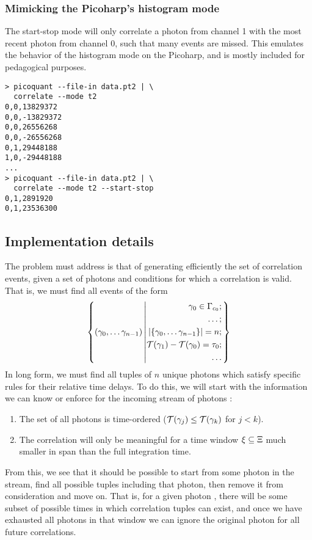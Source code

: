 \subsubsection{Mimicking the Picoharp's histogram mode}
The start-stop mode will only correlate a photon from channel 1 with the most recent photon from channel 0, such that many events are missed. This emulates the behavior of the histogram mode on the Picoharp, and is mostly included for pedagogical purposes.
\begin{verbatim}
> picoquant --file-in data.pt2 | \
  correlate --mode t2 
0,0,13829372
0,0,-13829372
0,0,26556268
0,0,-26556268
0,1,29448188
1,0,-29448188
...
> picoquant --file-in data.pt2 | \
  correlate --mode t2 --start-stop
0,1,2891920
0,1,23536300
\end{verbatim}

\subsection{Implementation details}
\label{sec:correlation_implementation}

The problem \program{correlate} must address is that of generating efficiently the set of correlation events, given a set of photons and conditions for which a correlation is valid. That is, we must find all events of the form
\begin{equation}
\left\lbrace (\gamma_{0},\ldots\gamma_{n-1})
        \left|
        \begin{aligned}
        \gamma_{0}\in\Gamma_{c_{0}};\\
        \ldots; \\
        \left|\left\lbrace \gamma_{0},\ldots\gamma_{n-1} \right\rbrace\right|=n;\\
        \mathcal{T}(\gamma_{1})-\mathcal{T}(\gamma_{0})=\tau_{0};\\
        \ldots
        \end{aligned}
        \right. \right\rbrace
\end{equation}
In long form, we must find all tuples of $n$ unique photons which satisfy specific rules for their relative time delays. To do this, we will start with the information we can know or enforce for the incoming stream of photons \photons:
\begin{enumerate}
\item The set \photons{} of all photons is time-ordered ($\mathcal{T}(\gamma_{j})\le\mathcal{T}(\gamma_{k})$ for $j<k$).
\item The correlation will only be meaningful for a time window $\xi\subseteq\Xi$  much smaller in span than the full integration time.
\end{enumerate}
From this, we see that it should be possible to start from some photon in the stream, find all possible tuples including that photon, then remove it from consideration and move on. That is, for a given photon \photon, there will be some subset of possible times \timewindow{} in which correlation tuples can exist, and once we have exhausted all photons in that window we can ignore the original photon for all future correlations. 

